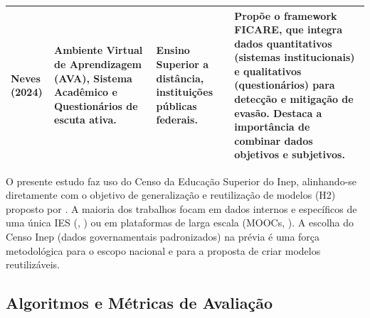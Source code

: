 \documentclass[english, spanish, brazilian]{RBIEarticle} %
\begin{document}
\begin{longtable}{|p{3cm}|p{3.5cm}|p{4.5cm}|p{5cm}|}
    Neves (2024) & Ambiente Virtual de Aprendizagem (AVA), Sistema Acadêmico e Questionários de escuta ativa. & Ensino Superior a distância, instituições públicas federais. & Propõe o framework FICARE, que integra dados quantitativos (sistemas institucionais) e qualitativos (questionários) para detecção e mitigação de evasão. Destaca a importância de combinar dados objetivos e subjetivos. \\ 
    \bottomrule
\end{longtable}

O presente estudo faz uso do Censo da Educação Superior do Inep, alinhando-se diretamente com o objetivo de generalização e reutilização de modelos (H2) proposto por \cite{jesus2024mapeamento}. A maioria dos trabalhos focam em dados internos e específicos de uma única IES (\cite{ramos2018comparativo}, \cite{neves2024ficare}) ou em plataformas de larga escala (MOOCs, \cite{tamada2025predicting}). A escolha do Censo Inep (dados governamentais padronizados) na prévia é uma força metodológica para o escopo nacional e para a proposta de criar modelos reutilizáveis.


\subsection{Algoritmos e Métricas de Avaliação}
\end{document}
